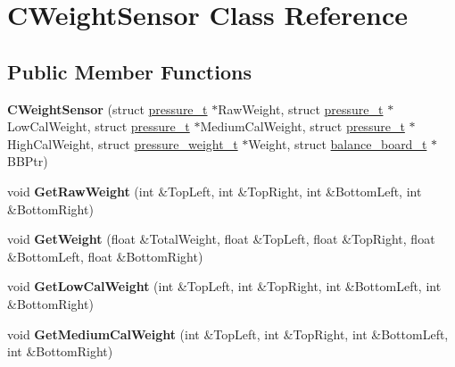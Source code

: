 \hypertarget{class_c_weight_sensor}{\section{C\-Weight\-Sensor Class Reference}
\label{class_c_weight_sensor}
}
\subsection*{Public Member Functions}
\begin{DoxyCompactItemize}
\item 
\hypertarget{class_c_weight_sensor_a04fea64b48194689bf78171e51e97b2d}{{\bfseries C\-Weight\-Sensor} (struct \hyperlink{structpressure__t}{pressure\-\_\-t} $\ast$Raw\-Weight, struct \hyperlink{structpressure__t}{pressure\-\_\-t} $\ast$Low\-Cal\-Weight, struct \hyperlink{structpressure__t}{pressure\-\_\-t} $\ast$Medium\-Cal\-Weight, struct \hyperlink{structpressure__t}{pressure\-\_\-t} $\ast$High\-Cal\-Weight, struct \hyperlink{structpressure__weight__t}{pressure\-\_\-weight\-\_\-t} $\ast$Weight, struct \hyperlink{structbalance__board__t}{balance\-\_\-board\-\_\-t} $\ast$B\-B\-Ptr)}\label{class_c_weight_sensor_a04fea64b48194689bf78171e51e97b2d}

\item 
\hypertarget{class_c_weight_sensor_a3afa84d9e73a9d4d86462661549b3114}{void {\bfseries Get\-Raw\-Weight} (int \&Top\-Left, int \&Top\-Right, int \&Bottom\-Left, int \&Bottom\-Right)}\label{class_c_weight_sensor_a3afa84d9e73a9d4d86462661549b3114}

\item 
\hypertarget{class_c_weight_sensor_a8c7a1bc975f98685aaad423a1e26cffd}{void {\bfseries Get\-Weight} (float \&Total\-Weight, float \&Top\-Left, float \&Top\-Right, float \&Bottom\-Left, float \&Bottom\-Right)}\label{class_c_weight_sensor_a8c7a1bc975f98685aaad423a1e26cffd}

\item 
\hypertarget{class_c_weight_sensor_a6cf2534f75d4f3dd629d49958f0ba7ee}{void {\bfseries Get\-Low\-Cal\-Weight} (int \&Top\-Left, int \&Top\-Right, int \&Bottom\-Left, int \&Bottom\-Right)}\label{class_c_weight_sensor_a6cf2534f75d4f3dd629d49958f0ba7ee}

\item 
\hypertarget{class_c_weight_sensor_a6d3ab9b23321846eb9bcf8401b02ba4e}{void {\bfseries Get\-Medium\-Cal\-Weight} (int \&Top\-Left, int \&Top\-Right, int \&Bottom\-Left, int \&Bottom\-Right)}\label{class_c_weight_sensor_a6d3ab9b23321846eb9bcf8401b02ba4e}


\end{DoxyCompactItemize}
